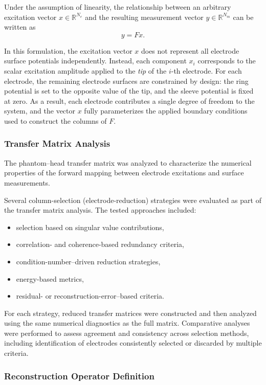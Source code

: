 Under the assumption of linearity, the relationship between an arbitrary excitation vector $x \in \mathbb{R}^{N_e}$ and the resulting measurement vector $y \in \mathbb{R}^{N_m}$ can be written as
\[
y = F x.
\]

In this formulation, the excitation vector $x$ does not represent all electrode surface potentials independently. Instead, each component $x_i$ corresponds to the scalar excitation amplitude applied to the \emph{tip} of the $i$-th electrode. For each electrode, the remaining electrode surfaces are constrained by design: the ring potential is set to the opposite value of the tip, and the sleeve potential is fixed at zero. As a result, each electrode contributes a single degree of freedom to the system, and the vector $x$ fully parameterizes the applied boundary conditions used to construct the columns of $F$.


\subsubsection{Transfer Matrix Analysis}

The phantom--head transfer matrix was analyzed to characterize the numerical properties of the forward mapping between electrode excitations and surface measurements.

Several column-selection (electrode-reduction) strategies were evaluated as part of the transfer matrix analysis. The tested approaches included:
\begin{itemize}
    \item selection based on singular value contributions,
    \item correlation- and coherence-based redundancy criteria,
    \item condition-number–driven reduction strategies,
    \item energy-based metrics,
    \item residual- or reconstruction-error–based criteria.
\end{itemize}

For each strategy, reduced transfer matrices were constructed and then analyzed using the same numerical diagnostics as the full matrix. Comparative analyses were performed to assess agreement and consistency across selection methods, including identification of electrodes consistently selected or discarded by multiple criteria.

\subsubsection{Reconstruction Operator Definition}

